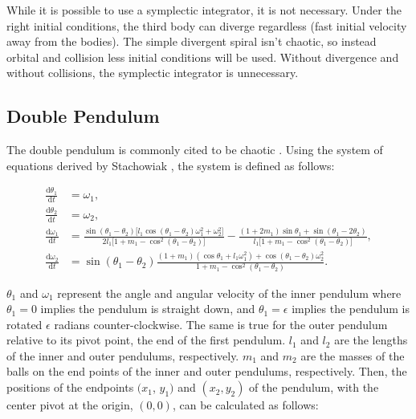 \documentclass{article}
\newcommand{\der}[2][t]{\frac{\mathrm{d}#2}{\mathrm{d}#1}}
\begin{document}
While it is possible to use a symplectic integrator, it is not necessary.
Under the right initial conditions, the third body can diverge regardless
(fast initial velocity away from the bodies). The simple divergent spiral
isn't chaotic, so instead orbital and collision less initial conditions
will be used. Without divergence and without collisions, the symplectic
integrator is unnecessary. 

\subsection{Double Pendulum}

The double pendulum is commonly cited to be chaotic
\cite{stachowiak2006numerical} \cite{levien1993double}. Using the system of
equations derived by Stachowiak \cite{stachowiak2006numerical}, the system is
defined as follows:

\begin{align}
    \der{\theta_1} &= \omega_1, \nonumber \\
    \der{\theta_2} &= \omega_2, \nonumber \\
    \der{\omega_1} &= 
    \frac{
        \sin(\theta_1 - \theta_2) \lbrack
            l_1 \cos(\theta_1 - \theta_2) \omega_1^2 + \omega_2^2
        \rbrack
    }{
        2 l_1 \lbrack
            1 + m_1 - \cos^2(\theta_1 - \theta_2)
        \rbrack
    }
    -
    \frac{
        (1 + 2 m_1) \sin \theta_1 + \sin(\theta_1 - 2 \theta_2)
    }{
        l_1 \lbrack
            1 + m_1 - \cos^2(\theta_1 - \theta_2)
        \rbrack
    }
    , \nonumber \\
    \der{\omega_2} &= \sin (\theta_1 - \theta_2) 
    \frac{
        (1+m_1) (\cos \theta_1 + l_1 \omega_1^2)
        +
        \cos(\theta_1 - \theta_2) \omega_2^2
    }{
        1 + m_1 - \cos^2(\theta_1 - \theta_2)
    }. \label{eq:doub_pen}
\end{align}

$\theta_1$ and $\omega_1$ represent the angle and angular velocity of the
inner pendulum where $\theta_1=0$ implies the pendulum is straight down, and
$\theta_1=\epsilon$ implies the pendulum is rotated $\epsilon$ radians
counter-clockwise. The same is true for the outer pendulum relative to its
pivot point, the end of the first pendulum. $l_1$ and $l_2$ are the lengths
of the inner and outer pendulums, respectively. $m_1$ and $m_2$ are the
masses of the balls on the end points of the inner and outer pendulums,
respectively. Then, the positions of the endpoints $(x_1$, $y_1)$ and $(x_2,
y_2)$ of the pendulum, with the center pivot at the origin, $(0, 0)$, can be
calculated as follows:
\end{document}
